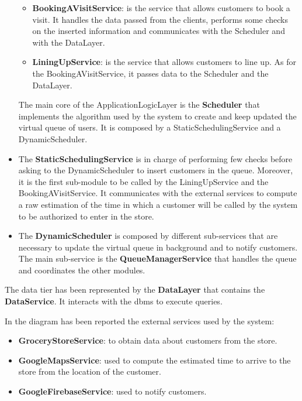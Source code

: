 \begin{itemize}
\begin{itemize}
        \item \textbf{BookingAVisitService}: is the service that allows customers to book a visit. It handles the data passed from the clients, performs some checks on the inserted information and communicates with the Scheduler and with the DataLayer.
        \item \textbf{LiningUpService}: is the service that allows customers to line up. As for the BookingAVisitService, it passes data to the Scheduler and the DataLayer.
    \end{itemize}

    The main core of the ApplicationLogicLayer is the \textbf{Scheduler} that implements the algorithm used by the system to create and keep updated the virtual queue of users. It is composed by a StaticSchedulingService and a DynamicScheduler.
    \item The \textbf{StaticSchedulingService} is in charge of performing few checks before asking to the DynamicScheduler to insert customers in the queue. Moreover, it is the first sub-module to be called by the LiningUpService and the BookingAVisitService. It communicates with the external services to compute a raw estimation of the time in which a customer will be called by the system to be authorized to enter in the store.
    \item The \textbf{DynamicScheduler} is composed by different sub-services that are necessary to update the virtual queue in background and to notify customers.
    The main sub-service is the \textbf{QueueManagerService} that handles the queue and coordinates the other modules.
\end{itemize}

The data tier has been represented by the \textbf{DataLayer} that contains the \textbf{DataService}. It interacts with the \gls{dbms} to execute queries.

In the diagram has been reported the external services used by the system:
\begin{itemize}
    \item \textbf{GroceryStoreService}: to obtain data about customers from the store.
    \item \textbf{GoogleMapsService}: used to compute the estimated time to arrive to the store from the location of the customer.
    \item \textbf{GoogleFirebaseService}: used to notify customers.
\end{itemize}


